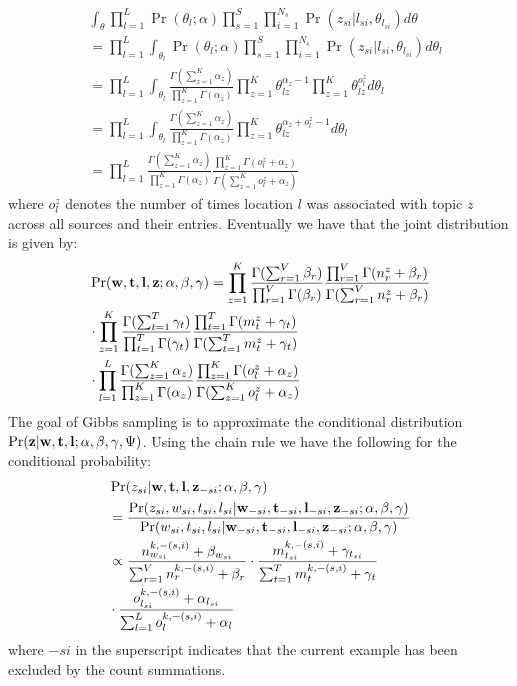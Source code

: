 \documentclass[conference]{IEEEtran}
\newcommand{\w}{{\bf w}}
\newcommand{\z}{{\bf z}}
\newcommand{\loc}{{\bf l}}
\newcommand{\tim}{{\bf t}}
\begin{document}
{\scriptsize
\begin{align}
&\int_{\theta} \prod_{l = 1}^{L}\Pr(\theta_l;\alpha)\prod_{s = 1}^{S}\prod_{i = 1}^{N_s}\Pr(z_{si}|l_{si},\theta_{l_{si}}) d\theta \nonumber \\
&= \prod_{l = 1}^L \int_{\theta_l} \Pr(\theta_l;\alpha)\prod_{s = 1}^{S}\prod_{i = 1}^{N_s}\Pr(z_{si}|l_{si},\theta_{l_{si}}) d\theta_l \nonumber \\
& = \prod_{l =1}^L\int_{\theta_l} \frac{\Gamma(\sum_{z = 1}^K \alpha_z)}{\prod_{z = 1}^K \Gamma(\alpha_z)}\prod_{z = 1}^K \theta_{lz}^{\alpha_z -1}\prod_{z=1}^K\theta_{lz}^{o^z_{l}}d\theta_l \nonumber \\
&= \prod_{l =1}^L\int_{\theta_l} \frac{\Gamma(\sum_{z = 1}^K \alpha_z)}{\prod_{z = 1}^K \Gamma(\alpha_z)}\prod_{z = 1}^K \theta_{lz}^{\alpha_z  + o^z_{l}-1}d\theta_l \nonumber \\
& = \prod_{l =1}^L\frac{\Gamma(\sum_{z = 1}^K \alpha_z)}{\prod_{z = 1}^K \Gamma(\alpha_z)}\frac{\prod_{z=1}^K\Gamma(o^z_l + \alpha_z)}{\Gamma(\sum_{z = 1}^K o^z_l + \alpha_z)}\nonumber
\end{align}}
where $o^z_l$ denotes the number of times location $l$ was associated with topic $z$ across all sources and their entries. 
Eventually we have that the joint distribution is given by:
{\scriptsize
\begin{align}
&\Pr(\w,\tim,\loc,\z;\alpha,\beta,\gamma) = \prod_{z = 1}^K \frac{\Gamma(\sum_{r = 1}^V \beta_r)}{\prod_{r = 1}^V \Gamma(\beta_r)} \frac{\prod_{r = 1}^V \Gamma(n^{z}_{r} + \beta_r)}{\Gamma(\sum_{r =1}^V n^{z}_{r} + \beta_r)} \nonumber \\
&\cdot \prod_{z = 1}^K \frac{\Gamma(\sum_{t = 1}^T \gamma_t)}{\prod_{t = 1}^T \Gamma(\gamma_t)} \frac{\prod_{t = 1}^T \Gamma(m^{z}_{t} + \gamma_t)}{\Gamma(\sum_{t =1}^T m^{z}_{t} + \gamma_t)} \nonumber \\
& \cdot \prod_{l =1}^L\frac{\Gamma(\sum_{z = 1}^K \alpha_z)}{\prod_{z = 1}^K \Gamma(\alpha_z)}\frac{\prod_{z=1}^K\Gamma(o^z_l + \alpha_z)}{\Gamma(\sum_{z = 1}^K o^z_l + \alpha_z)}  \nonumber
\end{align}}
The goal of Gibbs sampling is to approximate the conditional distribution $\Pr(\z | \w, \tim,\loc;\alpha,\beta,\gamma,\Psi)$. Using the chain rule we have the following for the conditional probability:
{\scriptsize
\begin{align}
&\Pr(z_{si}| \w,\tim,\loc,\z_{-si};\alpha,\beta,\gamma) \nonumber \\
&= \frac{\Pr(z_{si}, w_{si}, t_{si}, l_{si}|\w_{-si},\tim_{-si},\loc_{-si},\z_{-si};\alpha,\beta,\gamma)}{\Pr(w_{si}, t_{si}, l_{si}|\w_{-si},\tim_{-si},\loc_{-si},\z_{-si};\alpha,\beta,\gamma)} \nonumber \\
& \propto \frac{n^{k,-(s,i)}_{w_{si}} + \beta_{w_{si}}}{\sum_{r = 1}^V n^{k,-(s,i)}_{r} + \beta_{r}} \cdot \frac{m^{k,-(s,i)}_{t_{si}} + \gamma_{t_{si}}}{\sum_{t = 1}^T m^{k,-(s,i)}_{t} + \gamma_{t}} \nonumber \\
& \cdot \frac{o^{k,-(s,i)}_{l_{si}} + \alpha_{l_{si}}}{\sum_{l = 1}^L o^{k,-(s,i)}_{l} + \alpha_{l}} \nonumber
\end{align}}
where $-si$ in the superscript indicates that the current example has been excluded by the count summations. 
\end{document}

